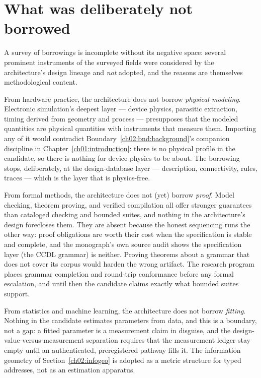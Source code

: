 \section{What was deliberately not borrowed}\label{ch02:notborrowed}

A survey of borrowings is incomplete without its negative space: several
prominent instruments of the surveyed fields were considered by the
architecture's design lineage and \emph{not} adopted, and the reasons are
themselves methodological content.

From hardware practice, the architecture does not borrow \emph{physical
modeling}. Electronic simulation's deepest layer --- device physics,
parasitic extraction, timing derived from geometry and process ---
presupposes that the modeled quantities are physical quantities with
instruments that measure them. Importing any of it would contradict
Boundary~\ref{ch02:bnd:background}'s companion discipline in
Chapter~\ref{ch01:introduction}: there is no physical profile in the
candidate, so there is nothing for device physics to be about. The
borrowing stops, deliberately, at the design-database layer ---
description, connectivity, rules, traces --- which is the layer that is
physics-free.

From formal methods, the architecture does not (yet) borrow \emph{proof}.
Model checking, theorem proving, and verified compilation all offer
stronger guarantees than cataloged checking and bounded suites, and
nothing in the architecture's design forecloses them. They are absent
because the honest sequencing runs the other way: proof obligations are
worth their cost when the specification is stable and complete, and the
monograph's own source audit shows the specification layer (the CCDL
grammar) is neither. Proving theorems about a grammar that does not
cover its corpus would harden the wrong artifact. The research program
places grammar completion and round-trip conformance before any formal
escalation, and until then the candidate claims exactly what bounded
suites support.

From statistics and machine learning, the architecture does not borrow
\emph{fitting}. Nothing in the candidate estimates parameters from data,
and this is a boundary, not a gap: a fitted parameter is a measurement
claim in disguise, and the design-value-versus-measurement separation
requires that the measurement ledger stay empty until an authenticated,
preregistered pathway fills it. The information geometry of
Section~\ref{ch02:infogeo} is adopted as a metric structure for typed
addresses, not as an estimation apparatus.

